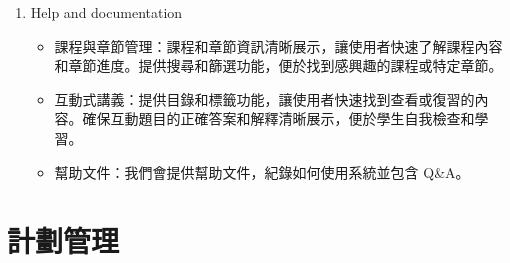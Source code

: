 \documentclass[12pt]{article}
\begin{document}
\begin{enumerate}[label=(\arabic*)]
  \item Help and documentation

  \begin{itemize}
    \item 課程與章節管理：課程和章節資訊清晰展示，讓使用者快速了解課程內容和章節進度。提供搜尋和篩選功能，便於找到感興趣的課程或特定章節。
    \item 互動式講義：提供目錄和標籤功能，讓使用者快速找到查看或復習的內容。確保互動題目的正確答案和解釋清晰展示，便於學生自我檢查和學習。
    \item 幫助文件：我們會提供幫助文件，紀錄如何使用系統並包含 Q\&A。
  \end{itemize}

\end{enumerate}

\section{計劃管理}
\end{document}
